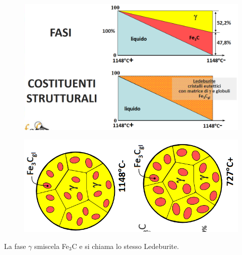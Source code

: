 \documentclass{article}
\begin{document}
{\begin{figure}[h!]
            \end{figure}
            \begin{figure}[h!]
                \centering
                \includegraphics[width=.7\linewidth]{L14 - C = 4,3 Diagrammi Fasi e Costituenti 1148+ a 1148-.png}
            \end{figure}
            \begin{figure}[h!]
                \centering
                \includegraphics[width=.7\linewidth]{L14 - C = 4,3 Strutture 1148- a 727+.png}
            \end{figure}
            \newpage
            La fase $\gamma$ smiscela Fe$_3$C e si chiama lo stesso Ledeburite.\\
            
}
\end{document}
